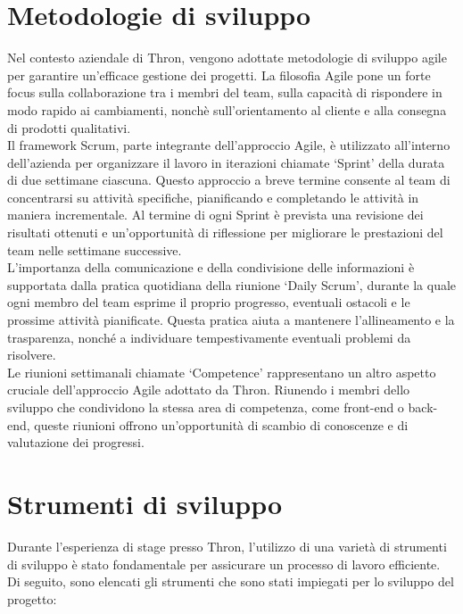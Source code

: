 \section{Metodologie di sviluppo}
Nel contesto aziendale di Thron, vengono adottate metodologie di sviluppo agile per garantire un'efficace
gestione dei progetti. La filosofia Agile pone un forte focus sulla collaborazione tra i membri del team,
sulla capacità di rispondere in modo rapido ai cambiamenti, nonchè sull'orientamento al cliente e alla consegna di prodotti qualitativi.\\
Il framework Scrum, parte integrante dell'approccio Agile, è utilizzato all'interno dell'azienda per organizzare il lavoro in iterazioni chiamate
`Sprint' della durata di due settimane ciascuna. Questo approccio a breve termine consente al team di concentrarsi su attività specifiche, pianificando
e completando le attività in maniera incrementale. Al termine di ogni Sprint è prevista una revisione dei risultati ottenuti e un'opportunità 
di riflessione per migliorare le prestazioni del team nelle settimane successive.\\
L'importanza della comunicazione e della condivisione delle informazioni è supportata dalla pratica quotidiana della riunione `Daily Scrum', durante la quale
ogni membro del team esprime il proprio progresso, eventuali ostacoli e le prossime attività pianificate. Questa pratica aiuta a mantenere l'allineamento e
la trasparenza, nonché a individuare tempestivamente eventuali problemi da risolvere.\\
Le riunioni settimanali chiamate `Competence' rappresentano un altro aspetto cruciale dell'approccio Agile adottato da Thron. Riunendo i membri dello sviluppo 
che condividono la stessa area di competenza, come front-end o back-end, queste riunioni offrono un'opportunità di scambio di conoscenze e di valutazione dei progressi.

\section{Strumenti di sviluppo}
Durante l'esperienza di stage presso Thron, l'utilizzo di una varietà di strumenti di sviluppo è stato fondamentale per assicurare un processo di lavoro efficiente.\\
Di seguito, sono elencati gli strumenti che sono stati impiegati per lo sviluppo del progetto:

